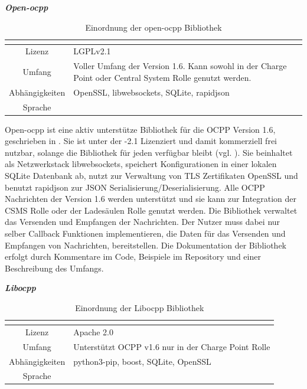 \begin{table}[H]
	\textbf{\textit{Open-ocpp}}\cite{Open-ocpp}\\
	\begin{tabularx}{\textwidth}{| c | X |}
		\multicolumn{1}{c}{} & \multicolumn{1}{c}{}\\ \hline
		Lizenz & LGPLv2.1  \newline \\
		Umfang & Voller Umfang der Version 1.6. Kann sowohl in der Charge Point oder Central System Rolle genutzt werden.  \newline \\
		Abhängigkeiten & OpenSSL, libwebsockets, SQLite, rapidjson\newline \\
		Sprache & \cpp \\ \hline
	\end{tabularx}
	\caption{\label{tab:test_tabelle} Einordnung der open-ocpp Bibliothek \cite{Eigene_Darstellung}}
\end{table}

\noindent Open-ocpp ist eine aktiv unterstütze Bibliothek für die OCPP Version 1.6, geschrieben in \cpp. Sie ist unter der -2.1 Lizenziert und damit kommerziell frei nutzbar, solange die Bibliothek für jeden verfügbar bleibt (vgl. \cite{GNU_LGPL2_1}). Sie beinhaltet als Netzwerkstack libwebsockets, speichert Konfigurationen in einer lokalen SQLite Datenbank ab, nutzt zur Verwaltung von TLS Zertifikaten OpenSSL und benutzt rapidjson zur \acs{JSON} Serialisierung/Deserialisierung. Alle \acs{OCPP} Nachrichten der Version 1.6 werden unterstützt und sie kann zur Integration der \acs{CSMS} Rolle oder der Ladesäulen Rolle genutzt werden. Die Bibliothek verwaltet das Versenden und Empfangen der Nachrichten. Der Nutzer muss dabei nur selber Callback Funktionen implementieren, die Daten für das Versenden und Empfangen von Nachrichten, bereitstellen. Die Dokumentation der Bibliothek erfolgt durch Kommentare im Code, Beispiele im Repository und einer Beschreibung des Umfangs.

\begin{table}[H]
	\textbf{\textit{Libocpp}}\cite{Libocpp}\\
	\begin{tabularx}{\textwidth}{| c | X |}
		\multicolumn{1}{c}{} & \multicolumn{1}{c}{}\\ \hline
		Lizenz & Apache 2.0 \newline \\
		Umfang & Unterstützt OCPP v1.6 nur in der Charge Point Rolle\newline \\
		Abhängigkeiten & python3-pip, boost, SQLite, OpenSSL\newline \\
		Sprache & \cpp\\ \hline
	\end{tabularx}
	\caption{\label{tab:test_tabelle} Einordnung der Libocpp Bibliothek \cite{Eigene_Darstellung}}
\end{table}

